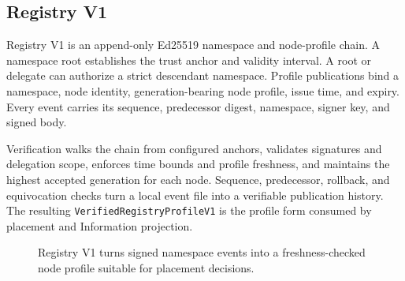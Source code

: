 \documentclass[11pt,oneside]{article}
\begin{document}
\subsection{Registry V1}
\label{sec:registry}

Registry V1 is an append-only Ed25519 namespace and node-profile chain. A
namespace root establishes the trust anchor and validity interval. A root or
delegate can authorize a strict descendant namespace. Profile publications
bind a namespace, node identity, generation-bearing node profile, issue time,
and expiry. Every event carries its sequence, predecessor digest, namespace,
signer key, and signed body.

Verification walks the chain from configured anchors, validates signatures and
delegation scope, enforces time bounds and profile freshness, and maintains the
highest accepted generation for each node. Sequence, predecessor, rollback,
and equivocation checks turn a local event file into a verifiable publication
history. The resulting \texttt{VerifiedRegistryProfileV1} is the profile form
consumed by placement and Information projection.

\begin{figure}[htbp]
\centering
{}
\caption{Registry V1 turns signed namespace events into a freshness-checked
node profile suitable for placement decisions.}
\label{fig:registry}
\end{figure}
\end{document}
